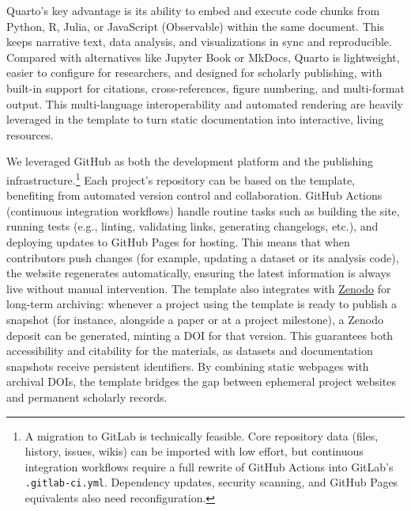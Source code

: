 \documentclass[final]{anthology-ch} %
\begin{document}
Quarto's key advantage is its ability to embed and execute code chunks from Python, R, Julia, or JavaScript (Observable) within the same document. This keeps narrative text, data analysis, and visualizations in sync and reproducible. Compared with alternatives like Jupyter Book or MkDocs, Quarto is lightweight, easier to configure for researchers, and designed for scholarly publishing, with built-in support for citations, cross-references, figure numbering, and multi-format output. This multi-language interoperability and automated rendering are heavily leveraged in the template to turn static documentation into interactive, living resources.

We leveraged GitHub as both the development platform and the publishing infrastructure.\footnote{A migration to GitLab is technically feasible. Core repository data (files, history, issues, wikis) can be imported with low effort, but continuous integration workflows require a full rewrite of GitHub Actions into GitLab's \texttt{.gitlab-ci.yml}. Dependency updates, security scanning, and GitHub Pages equivalents also need reconfiguration.} Each project's repository can be based on the template, benefiting from automated version control and collaboration. GitHub Actions (continuous integration workflows) handle routine tasks such as building the site, running tests (e.g., linting, validating links, generating changelogs, etc.), and deploying updates to GitHub Pages for hosting. This means that when contributors push changes (for example, updating a dataset or its analysis code), the website regenerates automatically, ensuring the latest information is always live without manual intervention. The template also integrates with \href{https://zenodo.org/}{Zenodo} for long-term archiving: whenever a project using the template is ready to publish a snapshot (for instance, alongside a paper or at a project milestone), a Zenodo deposit can be generated, minting a DOI for that version. This guarantees both accessibility and citability for the materials, as datasets and documentation snapshots receive persistent identifiers. By combining static webpages with archival DOIs, the template bridges the gap between ephemeral project websites and permanent scholarly records.
\end{document}
